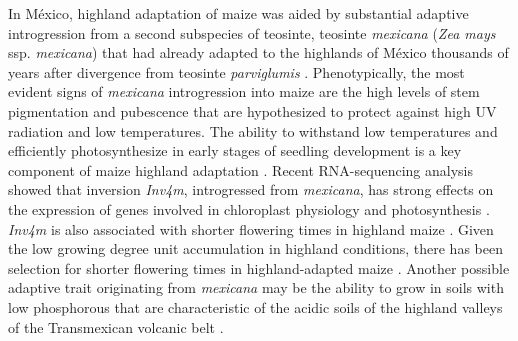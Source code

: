 \documentclass[9pt,twocolumn,twoside,lineno]{BioRxiv}
\begin{document}
In México, highland adaptation of maize was aided by substantial adaptive introgression from a second subspecies of teosinte, teosinte \textit{mexicana} (\textit{Zea mays} ssp. \textit{mexicana}) that had already adapted to the highlands of México thousands of years after divergence from teosinte \textit{parviglumis} \cite{Hufford2013-gs, Gonzalez-Segovia2019-jy}. 
Phenotypically, the most evident signs of \textit{mexicana} introgression into maize are the high levels of stem pigmentation and pubescence \cite{Lauter2004-eq} that are hypothesized to protect against high UV radiation and low temperatures. 
The ability to withstand low temperatures and efficiently photosynthesize in early stages of seedling development is a key component of maize highland adaptation \cite{Hardacre1980-tq}.
Recent RNA-sequencing analysis showed that inversion \textit{Inv4m}, introgressed from \textit{mexicana}, has strong effects on the expression of genes involved in chloroplast physiology and photosynthesis \cite{Crow2020-gene}.  
\textit{Inv4m} is also associated with shorter flowering times in highland maize \cite{Romero_Navarro2017-cn, Gates2019-xu}. 
Given the low growing degree unit accumulation in highland conditions, there has been selection for shorter flowering times in highland-adapted maize \cite{Gates2019-xu}.
Another possible adaptive trait originating from \textit{mexicana} may be the ability to grow in soils with low phosphorous \cite{AguirreLiguori2019-fl, Fustier2017-sl} that are characteristic of the acidic soils of the highland valleys of the Transmexican volcanic belt \cite{Krasilnikov2013-sm}.
\end{document}
